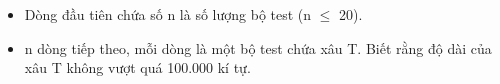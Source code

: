 \begin{itemize}
	\item     Dòng đầu tiên chứa số n là số lượng bộ test (n $\le$ 20).   
	\item     n dòng tiếp theo, mỗi dòng là một bộ test chứa xâu T. Biết rằng độ dài của xâu T không vượt quá 100.000 kí tự.   
\end{itemize}